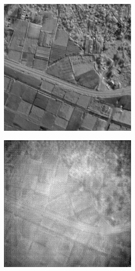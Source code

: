 \documentclass[10pt,twocolumn,letterpaper]{article}
\begin{document}
\begin{figure}[!ht]
  \centering
  \begin{subfigure}[b]{0.19\textwidth}
      \centering
      \includegraphics[width=\textwidth]{../figs/outputs/pan/112.png}
  \end{subfigure}
  \hfill
  \begin{subfigure}[b]{0.19\textwidth}
      \centering
      \includegraphics[width=\textwidth]{../figs/outputs/cycleGan/112.png}

\end{subfigure}
\end{figure}
\end{document}
